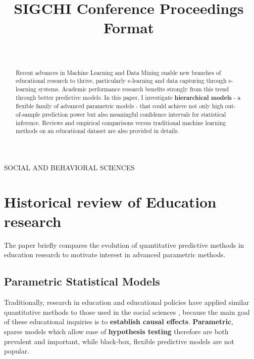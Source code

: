 \documentclass{sigchi}
\def\plaintitle{SIGCHI Conference Proceedings Format}
\begin{document}
\title{\plaintitle}

\author{%
  \\
}


\maketitle

\begin{abstract}
  Recent advances in Machine Learning and Data Mining enable new
  branches of educational research to thrive, particularly e-learning and data
  capturing through e-learning systems. \cite{romero2010educational}
  Academic performance research benefits strongly from this trend
  through better predictive models. In this paper,
  I investigate \textbf{hierarchical models} - a flexible family of advanced
  parametric models - that could achieve not only high out-of-sample prediction
  power but also meaningful confidence intervals for statistical
  inference. Reviews and empirical comparisons versus traditional machine
  learning methods on an educational dataset are also provided in details.
  
\end{abstract}

 
{SOCIAL AND BEHAVIORAL SCIENCES}  


\section{Historical review of Education research}
The paper briefly compares the evolution of quantitative predictive methods in
education research to motivate interest in advanced parametric methods.

\subsection{Parametric Statistical Models}
Traditionally, research in education and educational
policies have applied similar quantitative methods to those used in the social sciences
\cite{gelman2009quantitative}, because the main goal of these
educational inquiries is to \textbf{establish causal effects}. \textbf{Parametric}, sparse models which allow ease of \textbf{hypothesis testing}
therefore are both prevalent and important, while black-box,
flexible predictive models are not popular. \cite{teo2014handbook}
\end{document}

